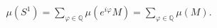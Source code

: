 \documentclass[preview]{standalone}
\begin{document}
\begin{align*}
\mu(S^1) = \sum_{\varphi \in \mathbb{Q}} \mu(e^{i\varphi} M) = \sum_{\varphi \in \mathbb{Q}} \mu(M).
\end{align*}
\end{document}
